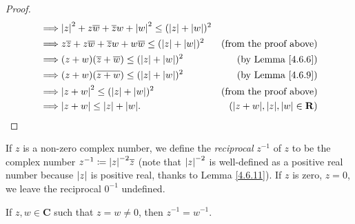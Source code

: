 \begin{proof}
\begin{align*}
        \implies & \abs*{z}^2 + z \overline{w} + \overline{z} w + \abs*{w}^2 \leq (\abs*{z} + \abs*{w})^2                                                                           \\
        \implies & z \overline{z} + z \overline{w} + \overline{z} w + w \overline{w} \leq (\abs*{z} + \abs*{w})^2               & \text{(from the proof above)}                     \\
        \implies & (z + w) (\overline{z} + \overline{w}) \leq (\abs*{z} + \abs*{w})^2                                           & \text{(by Lemma \ref{4.6.6})}                     \\
        \implies & (z + w) (\overline{z + w}) \leq (\abs*{z} + \abs*{w})^2                                                      & \text{(by Lemma \ref{4.6.9})}                     \\
        \implies & \abs*{z + w}^2 \leq (\abs*{z} + \abs*{w})^2                                                                  & \text{(from the proof above)}                     \\
        \implies & \abs*{z + w} \leq \abs*{z} + \abs*{w}.                                                                       & (\abs*{z + w}, \abs*{z}, \abs*{w} \in \mathbf{R})
    \end{align*}
\end{proof}

\begin{definition}\label{4.6.12}
    If \(z\) is a non-zero complex number, we define the \emph{reciprocal} \(z^{-1}\) of \(z\) to be the complex number \(z^{-1} \coloneqq \abs*{z}^{-2} \overline{z}\)
    (note that \(\abs*{z}^{-2}\) is well-defined as a positive real number because \(\abs*{z}\) is positive real, thanks to Lemma \ref{4.6.11}).
    If \(z\) is zero, \(z = 0\), we leave the reciprocal \(0^{-1}\) undefined.
\end{definition}

\begin{additional corollary}\label{ac 4.6.5}
If \(z, w \in \mathbf{C}\) such that \(z = w \neq 0\), then \(z^{-1} = w^{-1}\).
\end{additional corollary}

